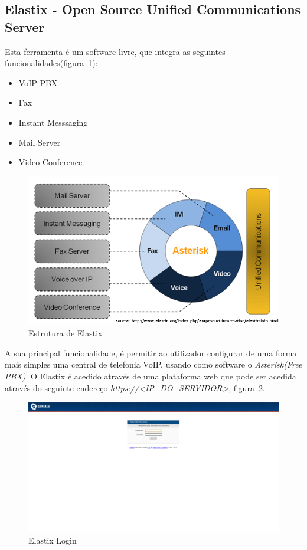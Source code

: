 \subsection{Elastix - Open Source Unified Communications Server}

Esta ferramenta é um software livre, que integra as seguintes funcionalidades(figura~\ref{fig:elastix}):
\begin{itemize}
\item VoIP PBX
\item Fax
\item Instant Messsaging
\item Mail Server
\item Video Conference
\end{itemize}

\begin{figure}[H]
    \begin{center}
        \includegraphics[width=12cm]{include/img/elastix.png}
    \end{center}
    \caption{Estrutura de Elastix}
    \label{fig:elastix}
\end{figure}

A sua principal funcionalidade, é permitir ao utilizador configurar de uma forma mais simples uma 
central de telefonia VoIP, usando como software o \emph{Asterisk(Free PBX)}. O Elastix é acedido através de uma plataforma
web que pode ser acedida através do seguinte endereço \emph{https://<IP\_DO\_SERVIDOR>}, figura~\ref{fig:elastix_login}.

\begin{figure}[H]
    \begin{center}
        \includegraphics[width=13cm]{include/img/elastix_login.png}
    \end{center}
    \caption{Elastix Login}
    \label{fig:elastix_login}
\end{figure}

